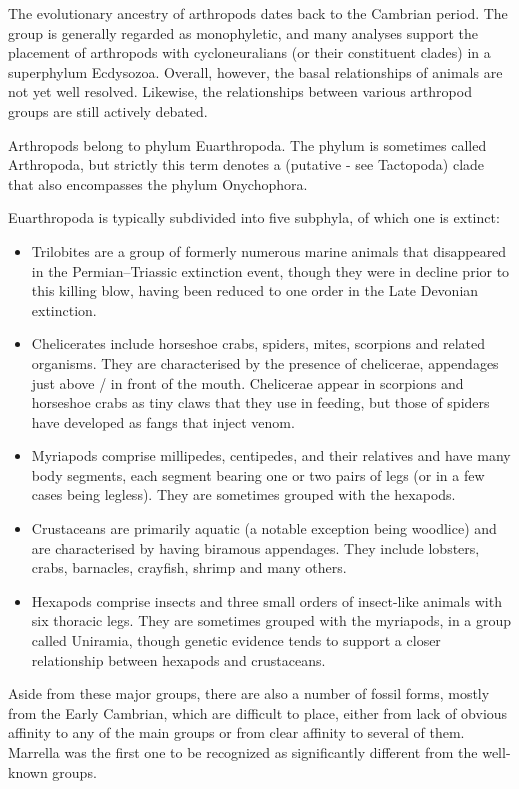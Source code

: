 The evolutionary ancestry of arthropods dates back to the Cambrian period. The group is generally regarded as monophyletic, and many analyses support the placement of arthropods with cycloneuralians (or their constituent clades) in a superphylum Ecdysozoa. Overall, however, the basal relationships of animals are not yet well resolved. Likewise, the relationships between various arthropod groups are still actively debated.

Arthropods belong to phylum Euarthropoda. The phylum is sometimes called Arthropoda, but strictly this term denotes a (putative - see Tactopoda) clade that also encompasses the phylum Onychophora.

Euarthropoda is typically subdivided into five subphyla, of which one is extinct:

\begin{itemize}
\tightlist
\item
  Trilobites are a group of formerly numerous marine animals that disappeared in the Permian--Triassic extinction event, though they were in decline prior to this killing blow, having been reduced to one order in the Late Devonian extinction.
\item
  Chelicerates include horseshoe crabs, spiders, mites, scorpions and related organisms. They are characterised by the presence of chelicerae, appendages just above / in front of the mouth. Chelicerae appear in scorpions and horseshoe crabs as tiny claws that they use in feeding, but those of spiders have developed as fangs that inject venom.
\item
  Myriapods comprise millipedes, centipedes, and their relatives and have many body segments, each segment bearing one or two pairs of legs (or in a few cases being legless). They are sometimes grouped with the hexapods.
\item
  Crustaceans are primarily aquatic (a notable exception being woodlice) and are characterised by having biramous appendages. They include lobsters, crabs, barnacles, crayfish, shrimp and many others.
\item
  Hexapods comprise insects and three small orders of insect-like animals with six thoracic legs. They are sometimes grouped with the myriapods, in a group called Uniramia, though genetic evidence tends to support a closer relationship between hexapods and crustaceans.
\end{itemize}

Aside from these major groups, there are also a number of fossil forms, mostly from the Early Cambrian, which are difficult to place, either from lack of obvious affinity to any of the main groups or from clear affinity to several of them. Marrella was the first one to be recognized as significantly different from the well-known groups.

